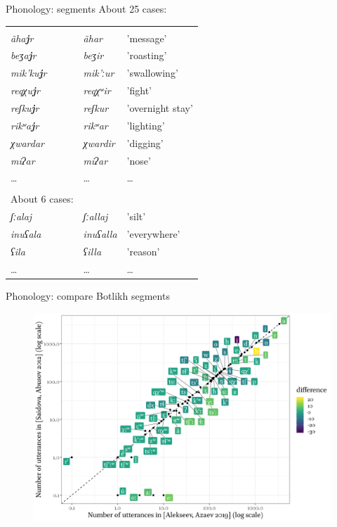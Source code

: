 \begin{frame}{Phonology: segments}
About 25 cases:\\

\begin{tabular}{lll}
\citet{alekseev2019} &\citet{saidovaabusov2012} & \\
\textit{ãha\textbf{\underline{j}}r}   & \textit{ãhar}   & 'message’        \\
\textit{beʒa\textbf{\underline{j}}r}   & \textit{beʒir}   & 'roasting’       \\
\textit{mik'ku\textbf{\underline{j}}r} & \textit{mik'ːur} & 'swallowing’     \\
\textit{reqχu\textbf{\underline{j}}r}  & \textit{reqχʷir} & 'fight’          \\
\textit{reʃku\textbf{\underline{j}}r}  & \textit{reʃkur}  & 'overnight stay’ \\
\textit{rikʷa\textbf{\underline{j}}r}  & \textit{rikʷar} & 'lighting’     \\ \hline
\textit{χwardar} & \textit{χwardir} & 'digging' \\
\textit{miʔar} & \textit{miʔar} & 'nose'\\ 
\dots & \dots & \dots \\ 
& & \\
About 6 cases: & & \\
\textit{ʃːalaj} & \textit{ʃːallaj} & 'silt' \\
\textit{inuʕala} & \textit{inuʕalla} & 'everywhere' \\
\textit{ʕila} & \textit{ʕilla} & 'reason' \\
\dots & \dots & \dots \\
\end{tabular}
\end{frame}

\begin{frame}{Phonology: compare Botlikh segments}
\begin{figure}[h]
\centering
\includegraphics[width = \linewidth]{images/04_compare_botlikh_dicts_with_stress.png}
\end{figure}
\end{frame}

